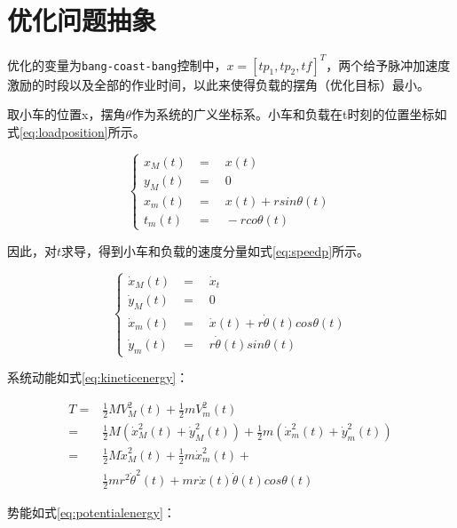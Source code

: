 \documentclass[]{ctexbook}
\begin{document}
\section{优化问题抽象}

优化的变量为\texttt{bang-coast-bang}控制中，\(x = [tp_1,tp_2,tf]^T\)，两个给予脉冲加速度激励的时段以及全部的作业时间，以此来使得负载的摆角（优化目标）最小。

取小车的位置x，摆角\(\theta\)作为系统的广义坐标系。小车和负载在t时刻的位置坐标如式\eqref{eq:loadposition}所示。

\begin{equation}
\begin{cases} 
x_M(t)&=\quad x(t)\\ 
y_M(t)&=\quad 0 \\
x_m(t)&=\quad x(t)+rsin\theta(t)\\
t_m(t)&=\quad -rco\theta(t)
\end{cases}
\label{eq:loadposition}
\end{equation}

因此，对\(t\)求导，得到小车和负载的速度分量如式\eqref{eq:speedp}所示。

\begin{equation}
\begin{cases} 
\dot{x}_M(t) &=\quad \dot{x}_t\\
\dot{y}_M(t) &=\quad 0\\
\dot{x}_m(t) &=\quad \dot{x}(t)+r\dot{\theta}(t)cos\theta(t)\\
\dot{y}_m(t) &=\quad r\dot{\theta}(t)sin\theta(t)
\end{cases}
\label{eq:speedp}
\end{equation}

系统动能如式\eqref{eq:kineticenergy}：

\begin{equation}
\begin{split}
T  = &\frac{1}{2}MV_M^2(t) + \frac{1}{2}mV_m^2(t) \\
=&\frac{1}{2}M(\dot{x}_M^2(t)+\dot{y}_M^2(t))+\frac{1}{2}m(\dot{x}_m^2(t)+\dot{y}_m^2(t))\\
=&\frac{1}{2}M\dot{x}_M^2(t) + \frac{1}{2}m\dot{x}_m^2(t) + \\
&\frac{1}{2}mr^2\dot{\theta}^2(t) + mr\dot{x}(t)\dot{\theta}(t)cos\theta(t)
\end{split}
\label{eq:kineticenergy}
\end{equation}

势能如式\eqref{eq:potentialenergy}：
\end{document}
